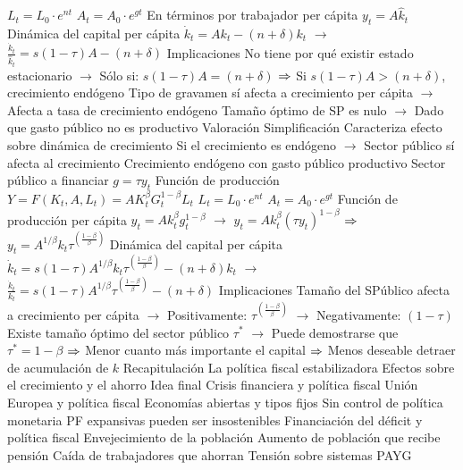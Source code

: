 \documentclass{nuevotema}
\begin{document}
\begin{esquemal}
				\4[] $L_t = L_0 \cdot e^{nt}$
				\4[] $A_t = A_0 \cdot e^{gt}$
				\4[] En términos por trabajador per cápita
				\4[] $y_t = A \hat{k}_t$
				\4[] Dinámica del capital per cápita
				\4[] $\dot{k}_t =  A {k}_t - (n+\delta){k}_t$
				\4[] $\to$ $\frac{\dot{{k}}_t}{\hat{k}_t} = s(1-\tau)A - (n+\delta)$
				\4 Implicaciones
				\4[] No tiene por qué existir estado estacionario
				\4[] $\to$ Sólo si: $s(1-\tau)A = \left( n+\delta \right)$
				\4[] $\Rightarrow$ Si $s(1-\tau)A > \left( n+\delta \right)$, crecimiento endógeno
				\4[] Tipo de gravamen sí afecta a crecimiento per cápita
				\4[] $\to$ Afecta a tasa de crecimiento endógeno
				\4[] Tamaño óptimo de SP es nulo
				\4[] $\to$ Dado que gasto público no es productivo
				\4 Valoración
				\4[] Simplificación
				\4[] Caracteriza efecto sobre dinámica de crecimiento
				\4[] Si el crecimiento es endógeno
				\4[] $\to$ Sector público sí afecta al crecimiento
			\3 Crecimiento endógeno con gasto público productivo
				\4[] Sector público a financiar
				\4[] $g = \tau y_t$
				\4[] Función de producción
				\4[] $Y = F(K_t, A, L_t) = A K_t^\beta G_t^{1-\beta} L_t$
				\4[] $L_t = L_0 \cdot e^{nt}$
				\4[] $A_t = A_0 \cdot e^{gt}$
				\4[] Función de producción per cápita
				\4[] $y_t = A k_t^\beta g_t^{1-\beta}$
				\4[] $\to$ $y_t = A k_t^\beta (\tau y_t)^{1-\beta}$
				\4[] $\Rightarrow$ $y_t = A^{1/\beta} k_t \tau^{\left( \frac{1-\beta}{\beta} \right) }$
				\4[] Dinámica del capital per cápita
				\4[] $\dot{k}_t =  s(1-\tau)A^{1/\beta} {k}_t \tau^{\left( \frac{1-\beta}{\beta} \right)} - (n+\delta){k}_t$
				\4[] $\to$ $\frac{\dot{k}_t}{k_t} = s(1-\tau)A^{1/\beta} \tau^{\left( \frac{1-\beta}{\beta} \right)} - (n+\delta)$
				\4[] Implicaciones
				\4[] Tamaño del SPúblico afecta a crecimiento per cápita
				\4[] $\to$ Positivamente: $\tau^{\left( \frac{1-\beta}{\beta} \right)}$
				\4[] $\to$ Negativamente: $(1-\tau)$
				\4[] Existe tamaño óptimo del sector público $\tau^*$
				\4[] $\to$ Puede demostrarse que $\tau^* = 1-\beta$
				\4[] $\Rightarrow$ Menor cuanto más importante el capital
				\4[] $\Rightarrow$ Menos deseable detraer de acumulación de $k$
	\1 
		\2 Recapitulación
			\3 La política fiscal estabilizadora
			\3 Efectos sobre el crecimiento y el ahorro
		\2 Idea final
			\3 Crisis financiera y política fiscal
			\3 Unión Europea y política fiscal
				\4 Economías abiertas y tipos fijos
				\4 Sin control de política monetaria
				\4 PF expansivas pueden ser insostenibles
				\4[] Financiación del déficit y política fiscal
			\3 Envejecimiento de la población
				\4 Aumento de población que recibe pensión
				\4 Caída de trabajadores que ahorran
				\4 Tensión sobre sistemas PAYG
\end{esquemal}
\end{document}
